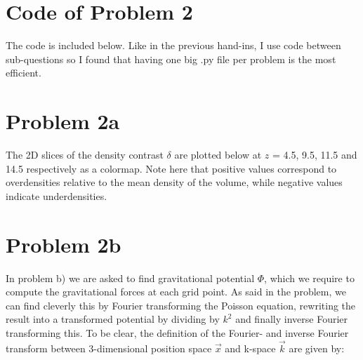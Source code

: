 \section*{Code of Problem 2}

The code is included below. Like in the previous hand-ins, I use code between sub-questions so I found that having one big .py file per problem is the most efficient.
%

\section*{Problem 2a}

The 2D slices of the density contrast $\delta$ are plotted below at $z$ = 4.5, 9.5, 11.5 and 14.5 respectively as a colormap. Note here that positive values correspond to overdensities relative to the mean density of the volume, while negative values indicate underdensities.





\section*{Problem 2b}

In problem b) we are asked to find gravitational potential $\Phi$, which we require to compute the gravitational forces at each grid point. As said in the problem, we can find cleverly this by Fourier transforming the Poisson equation, rewriting the result into a transformed potential by dividing by $k^2$ and finally inverse Fourier transforming this. To be clear, the definition of the Fourier- and inverse Fourier transform between 3-dimensional position space $\vec{x}$ and k-space $\vec{k}$ are given by:

